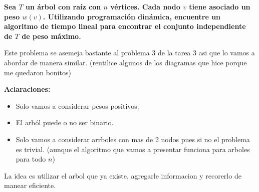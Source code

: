 \textbf{Sea $T$ un árbol con raíz con $n$ vértices. Cada nodo $v$ tiene asociado un peso $w(v)$. Utilizando programación dinámica, encuentre un algoritmo de tiempo lineal para encontrar el conjunto independiente de $T$ de peso máximo.}\vspace{.2cm}

Este problema se asemeja bastante al problema 3 de la tarea 3 asi que lo vamos a abordar de manera similar. (reutilice algunos de los diagramas que hice porque me quedaron bonitos) \vspace{.2cm}

\textbf{Aclaraciones:}
\begin{itemize}
    \item Solo vamos a considerar pesos positivos.
    \item El arból puede o no ser binario.
    \item Solo vamos a considerar arrboles con mas de 2 nodos pues si no el problema es trivial. (aunque el algoritmo que vamos a presentar funciona para arboles para todo $n$)
\end{itemize}

La idea es utilizar el arbol que ya existe, agregarle informacion y recorerlo de manear eficiente.

